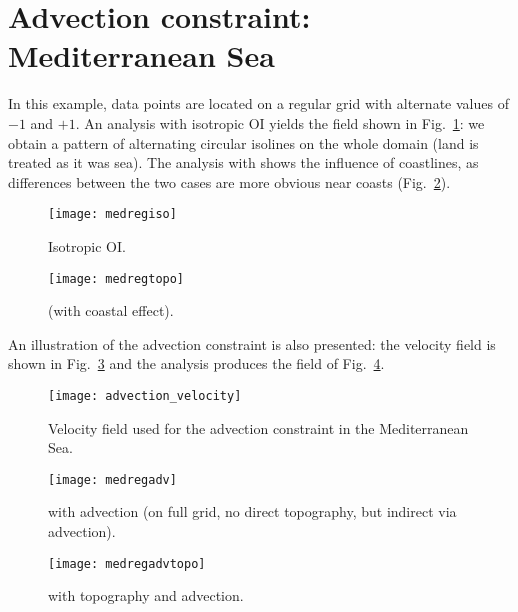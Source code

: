 \section[Advection constraint]{Advection constraint: Mediterranean Sea}


In this example, data points are located on a regular grid with alternate values of $-1$ and $+1$. An analysis with isotropic OI  yields the field shown in Fig.~\ref{fig:medregiso}: we obtain a pattern of alternating circular isolines on the whole domain (land is treated as it was sea). The analysis with \diva shows the influence of coastlines, as differences between the two cases are more obvious near coasts (Fig.~\ref{fig:medregtopo}).  

\begin{figure}[H]
\centering
\parbox{.6\textwidth}{
\texttt{[image: medregiso]}
}\parbox{.4\textwidth}{
\caption{Isotropic OI.\label{fig:medregiso}}
}
\end{figure}


\begin{figure}[H]
\centering
\parbox{.6\textwidth}{
\texttt{[image: medregtopo]}
}\parbox{.4\textwidth}{
\caption{\diva (with coastal effect).\label{fig:medregtopo} }
}
\end{figure}

An illustration of the advection constraint  is also presented: the velocity field is shown in Fig.~\ref{fig:medsea_vel} and the analysis produces the field of Fig.~\ref{fig:medsea_adv}.

\begin{figure}[H]
\centering
\parbox{.6\textwidth}{
\texttt{[image: advection\_velocity]}
}\parbox{.4\textwidth}{
\caption{Velocity field used for the advection constraint in the Mediterranean Sea.\label{fig:medsea_vel}}
}
\end{figure}

\begin{figure}[H]
\centering
\parbox{.6\textwidth}{
\texttt{[image: medregadv]}
}\parbox{.4\textwidth}{
\caption{\diva with advection (on full grid, no direct topography, but indirect 
via advection).\label{fig:medsea_adv}}
}
\end{figure}


\begin{figure}[H]
\centering
\parbox{.6\textwidth}{
\texttt{[image: medregadvtopo]}
}\parbox{.4\textwidth}{
\caption{\diva with topography and advection.}
}
\end{figure}


